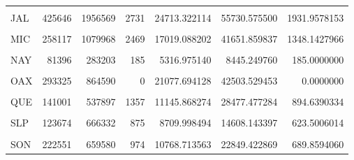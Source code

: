 \documentclass[
]{article}
\begin{document}
\begin{table}[H]
\begin{tabular}[t]{lrrrrrr}
\cellcolor{gray!6}{HID} & \cellcolor{gray!6}{140927} & \cellcolor{gray!6}{737813} & \cellcolor{gray!6}{798} & \cellcolor{gray!6}{9331.489836} & \cellcolor{gray!6}{23459.519342} & \cellcolor{gray!6}{566.4379931}\\
JAL & 425646 & 1956569 & 2731 & 24713.322114 & 55730.575500 & 1931.9578153\\
\cellcolor{gray!6}{MEX} & \cellcolor{gray!6}{883449} & \cellcolor{gray!6}{3909988} & \cellcolor{gray!6}{7748} & \cellcolor{gray!6}{56765.649370} & \cellcolor{gray!6}{136796.664492} & \cellcolor{gray!6}{3909.3186087}\\
\addlinespace
MIC & 258117 & 1079968 & 2469 & 17019.088202 & 41651.859837 & 1348.1427966\\
\cellcolor{gray!6}{MOR} & \cellcolor{gray!6}{109093} & \cellcolor{gray!6}{484504} & \cellcolor{gray!6}{364} & \cellcolor{gray!6}{6113.353616} & \cellcolor{gray!6}{20808.299349} & \cellcolor{gray!6}{364.0000000}\\
NAY & 81396 & 283203 & 185 & 5316.975140 & 8445.249760 & 185.0000000\\
\cellcolor{gray!6}{NLE} & \cellcolor{gray!6}{197403} & \cellcolor{gray!6}{1503188} & \cellcolor{gray!6}{2134} & \cellcolor{gray!6}{17956.984197} & \cellcolor{gray!6}{45934.192957} & \cellcolor{gray!6}{1237.1960233}\\
OAX & 293325 & 864590 & 0 & 21077.694128 & 42503.529453 & 0.0000000\\
\addlinespace
\cellcolor{gray!6}{PUE} & \cellcolor{gray!6}{425198} & \cellcolor{gray!6}{1351558} & \cellcolor{gray!6}{809} & \cellcolor{gray!6}{28040.784324} & \cellcolor{gray!6}{54736.050440} & \cellcolor{gray!6}{809.0000000}\\
QUE & 141001 & 537897 & 1357 & 11145.868274 & 28477.477284 & 894.6390334\\
\cellcolor{gray!6}{ROO} & \cellcolor{gray!6}{138127} & \cellcolor{gray!6}{424299} & \cellcolor{gray!6}{1442} & \cellcolor{gray!6}{9283.650409} & \cellcolor{gray!6}{20497.536257} & \cellcolor{gray!6}{663.2073582}\\
SLP & 123674 & 666332 & 875 & 8709.998494 & 14608.143397 & 623.5006014\\
\cellcolor{gray!6}{SIN} & \cellcolor{gray!6}{222713} & \cellcolor{gray!6}{645528} & \cellcolor{gray!6}{2586} & \cellcolor{gray!6}{9220.053952} & \cellcolor{gray!6}{19008.975118} & \cellcolor{gray!6}{1185.5167650}\\
\addlinespace
SON & 222551 & 659580 & 974 & 10768.713563 & 22849.422869 & 689.8594060\\

\end{tabular}
\end{table}
\end{document}

